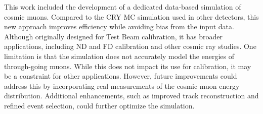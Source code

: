 This work included the development of a dedicated data-based simulation of cosmic muons. Compared to the \gls{CRY} \gls{MC} simulation used in other detectors, this new approach improves efficiency while avoiding bias from the input data. Although originally designed for Test Beam calibration, it has broader applications, including \gls{ND} and \gls{FD}  calibration and other cosmic ray studies. One limitation is that the simulation does not accurately model the energies of through-going muons. While this does not impact its use for calibration, it may be a constraint for other applications. However, future improvements could address this by incorporating real measurements of the cosmic muon energy distribution. Additional enhancements, such as improved track reconstruction and refined event selection, could further optimize the simulation.